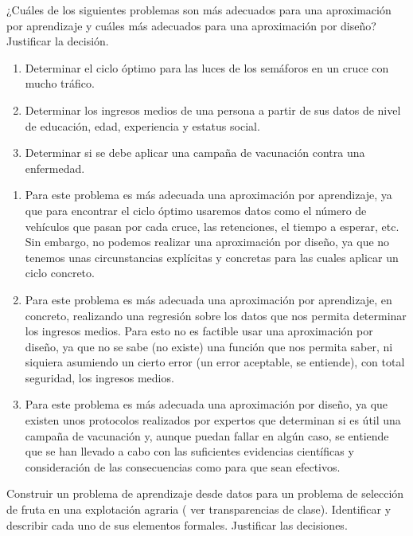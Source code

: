 \documentclass[11pt,leqno]{article}
\theoremstyle{definition}
\begin{document}
\begin{cuestion}
¿Cuáles de los siguientes problemas son más adecuados para una aproximación por aprendizaje y cuáles más adecuados para una aproximación por diseño? Justificar la decisión.
\begin{enumerate}[a]
\item Determinar el ciclo óptimo para las luces de los semáforos en un cruce con mucho tráfico.
\item Determinar los ingresos medios de una persona a partir de sus datos de nivel de educación, edad, experiencia y estatus social.
\item Determinar si se debe aplicar una campaña de vacunación contra una enfermedad.
\end{enumerate}
\end{cuestion}

\begin{solucion}
\begin{enumerate}[a]
\item Para este problema es más adecuada una aproximación por aprendizaje, ya que para encontrar el ciclo óptimo usaremos datos como el número de vehículos que pasan por cada cruce, las retenciones, el tiempo a esperar, etc. Sin embargo, no podemos realizar una aproximación por diseño, ya que no tenemos unas circunstancias explícitas y concretas para las cuales aplicar un ciclo concreto.
\item Para este problema es más adecuada una aproximación por aprendizaje,  en concreto, realizando una regresión sobre los datos que nos permita determinar los ingresos medios. Para esto no es factible usar una aproximación por diseño, ya que no se sabe (no existe) una función que nos permita saber, ni siquiera asumiendo un cierto error (un error aceptable, se entiende), con total seguridad, los ingresos medios.
\item Para este problema es más adecuada una aproximación por diseño, ya que existen unos protocolos realizados por expertos que determinan si es útil una campaña de vacunación y, aunque puedan fallar en algún caso, se entiende que se han llevado a cabo con las suficientes evidencias científicas y consideración de las consecuencias como para que sean efectivos.
\end{enumerate}
\end{solucion}


\begin{cuestion}
Construir un problema de aprendizaje desde datos para un problema de selección de fruta en una explotación agraria ( ver transparencias de clase). Identificar y describir cada uno
de sus elementos formales. Justificar las decisiones.
\end{cuestion}
\end{document}
